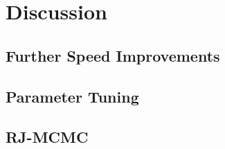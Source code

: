 \section{Discussion}
\label{sec:disc}

\subsection{Further Speed Improvements}

\subsection{Parameter Tuning}

\subsection{RJ-MCMC}